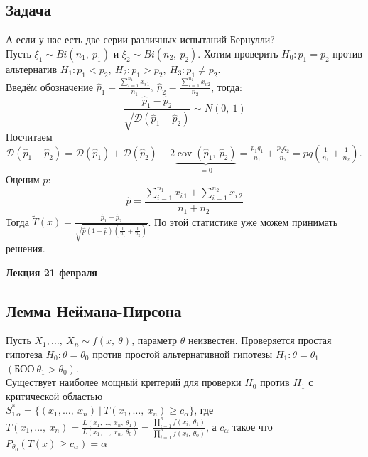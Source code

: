 \documentclass[12pt, a4paper]{article}
\newcommand{\dev}{\mathcal{D}}
\newcommand{\cov}{\operatorname{cov}}
\begin{document}
\subsection*{Задача}
А если у нас есть две серии различных испытаний Бернулли?\\
Пусть $\xi_1 \sim Bi(n_1,\ p_1)$ и $\xi_2 \sim Bi(n_2,\ p_2)$. Хотим проверить $H_0: p_1 = p_2$ против альтернатив $H_1: p_1 < p_2,\ H_2: p_1 > p_2,\ H_3: p_1 \neq p_2$.\\
Введём обозначение $\hat p_1 = \frac{\sum_{i = 1}^{n_1} x_{i\, 1} }{n_1},\ \hat p_2 = \frac{\sum_{i = 1}^{n_2} x_{i\, 2}}{n_2}$, тогда:
\[\frac{\hat p_1 - \hat p_2}{\sqrt{\dev (\hat p_1 - \hat p_2)}} \sim N(0,\ 1)\]
Посчитаем $\dev (\hat p_1 - \hat p_2) = \dev (\hat p_1) + \dev(\hat p_2) - 2\underset{=0}{\underbrace{\cov (\hat p_1,\ \hat p_2)}} =\frac{p_1 q_1}{n_1} + \frac{p_2 q_2}{n_2} = pq \left(\frac{1}{n_1} + \frac{1}{n_2}\right)$. \\
Оценим $p$:
\[\hat p = \frac{\sum\limits_{i = 1}^{n_1} x_{i\, 1} + \sum\limits_{i = 1}^{n_2} x_{i\, 2}}{n_1 + n_2}\]
Тогда $\tilde T(x) = \frac{\hat p_1 - \hat p_2}{\sqrt{\hat p (1 - \hat p)\left( \frac{1}{n_1} + \frac{1}{n_2} \right)}}$. По этой статистике уже можем принимать решения.

\begin{center}
\bf Лекция 21 февраля
\end{center}
\subsection*{Лемма Неймана-Пирсона}
Пусть $X_1,\dots,\ X_n \sim f(x,\ \theta)$, параметр $\theta$ неизвестен. Проверяется простая гипотеза $H_0: \theta = \theta_0$ против простой альтернативной гипотезы $H_1: \theta = \theta_1$ $(\text{БОО}\ \theta_1 > \theta_0)$.\\
Существует наиболее мощный критерий для проверки $H_0$ против $H_1$ с критической областью\\
$\displaystyle S^*_{1\, \alpha} = \{(x_1,\dots,\ x_n)\ |\ T(x_1,\dots,\ x_n) \geq c_{\alpha}\}$, где $T(x_1,\dots,\ x_n) = \frac{L(x_1,\dots,\ x_n,\ \theta_1)}{L(x_1,\dots,\ x_n,\ \theta_0)} = \frac{\prod_{i = 1}^{n} f(x_i,\ \theta_1)}{\prod_{i = 1}^{n} f(x_i,\ \theta_0)}$, а $c_{\alpha}$ такое что $P_{\theta_0}(T(x) \geq c_{\alpha}) = \alpha$  
\end{document}
